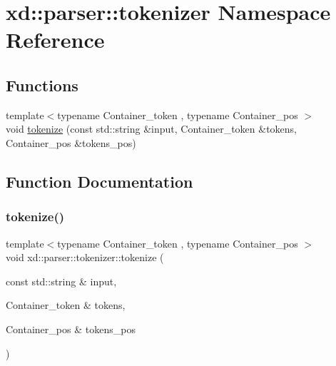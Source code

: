 \hypertarget{namespacexd_1_1parser_1_1tokenizer}{}\section{xd\+:\+:parser\+:\+:tokenizer Namespace Reference}
\label{namespacexd_1_1parser_1_1tokenizer}
\subsection*{Functions}
\begin{DoxyCompactItemize}
\item 
{\footnotesize template$<$typename Container\+\_\+token , typename Container\+\_\+pos $>$ }\\void \mbox{\hyperlink{namespacexd_1_1parser_1_1tokenizer_afa5957ff3dd3ec9917f507cf25c1e9bf}{tokenize}} (const std\+::string \&input, Container\+\_\+token \&tokens, Container\+\_\+pos \&tokens\+\_\+pos)
\end{DoxyCompactItemize}


\subsection{Function Documentation}
\mbox{\label{namespacexd_1_1parser_1_1tokenizer_afa5957ff3dd3ec9917f507cf25c1e9bf}} 
\subsubsection{\texorpdfstring{tokenize()}{tokenize()}}
{\footnotesize\ttfamily template$<$typename Container\+\_\+token , typename Container\+\_\+pos $>$ \\
void xd\+::parser\+::tokenizer\+::tokenize (\begin{DoxyParamCaption}\item[{const std\+::string \&}]{input,  }\item[{Container\+\_\+token \&}]{tokens,  }\item[{Container\+\_\+pos \&}]{tokens\+\_\+pos }\end{DoxyParamCaption})}

